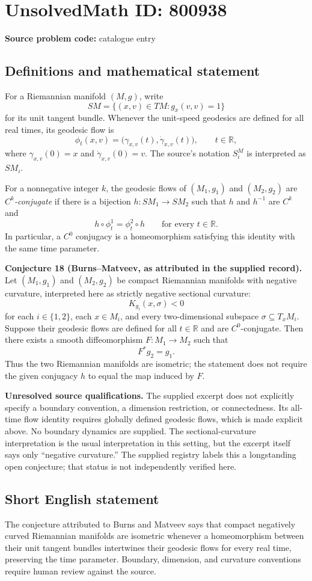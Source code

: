 \documentclass[11pt]{article}
\newcommand{\R}{\mathbb{R}}
\begin{document}
\section*{UnsolvedMath ID: 800938}
\textbf{Source problem code:} catalogue entry
\subsection{Definitions and mathematical statement}
For a Riemannian manifold $(M,g)$, write
\[
SM=\{(x,v)\in TM:g_x(v,v)=1\}
\]
for its unit tangent bundle. Whenever the unit-speed geodesics are defined for all real times, its geodesic flow is
\[
\phi_t(x,v)=\bigl(\gamma_{x,v}(t),\dot\gamma_{x,v}(t)\bigr),\qquad t\in\R,
\]
where $\gamma_{x,v}(0)=x$ and $\dot\gamma_{x,v}(0)=v$. The source's notation $S^M_i$ is interpreted as $SM_i$.

For a nonnegative integer $k$, the geodesic flows of $(M_1,g_1)$ and $(M_2,g_2)$ are \emph{$C^k$-conjugate} if there is a bijection $h:SM_1\to SM_2$ such that $h$ and $h^{-1}$ are $C^k$ and
\[
h\circ\phi_t^1=\phi_t^2\circ h\qquad\text{for every }t\in\R.
\]
In particular, a $C^0$ conjugacy is a homeomorphism satisfying this identity with the same time parameter.

\textbf{Conjecture 18 (Burns--Matveev, as attributed in the supplied record).} Let $(M_1,g_1)$ and $(M_2,g_2)$ be compact Riemannian manifolds with negative curvature, interpreted here as strictly negative sectional curvature:
\[
K_{g_i}(x,\sigma)<0
\]
for each $i\in\{1,2\}$, each $x\in M_i$, and every two-dimensional subspace $\sigma\subseteq T_xM_i$. Suppose their geodesic flows are defined for all $t\in\R$ and are $C^0$-conjugate. Then there exists a smooth diffeomorphism $F:M_1\to M_2$ such that
\[
F^*g_2=g_1.
\]
Thus the two Riemannian manifolds are isometric; the statement does not require the given conjugacy $h$ to equal the map induced by $F$.

\textbf{Unresolved source qualifications.} The supplied excerpt does not explicitly specify a boundary convention, a dimension restriction, or connectedness. Its all-time flow identity requires globally defined geodesic flows, which is made explicit above. No boundary dynamics are supplied. The sectional-curvature interpretation is the usual interpretation in this setting, but the excerpt itself says only ``negative curvature.'' The supplied registry labels this a longstanding open conjecture; that status is not independently verified here.
\subsection{Short English statement}
The conjecture attributed to Burns and Matveev says that compact negatively curved Riemannian manifolds are isometric whenever a homeomorphism between their unit tangent bundles intertwines their geodesic flows for every real time, preserving the time parameter. Boundary, dimension, and curvature conventions require human review against the source.
\end{document}
